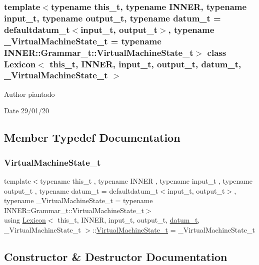 \subsubsection*{template$<$typename this\+\_\+t, typename I\+N\+N\+ER, typename input\+\_\+t, typename output\+\_\+t, typename datum\+\_\+t = defaultdatum\+\_\+t$<$input\+\_\+t, output\+\_\+t$>$, typename \+\_\+\+Virtual\+Machine\+State\+\_\+t = typename I\+N\+N\+E\+R\+::\+Grammar\+\_\+t\+::\+Virtual\+Machine\+State\+\_\+t$>$\newline
class Lexicon$<$ this\+\_\+t, I\+N\+N\+E\+R, input\+\_\+t, output\+\_\+t, datum\+\_\+t, \+\_\+\+Virtual\+Machine\+State\+\_\+t $>$}

\begin{DoxyAuthor}{Author}
piantado 
\end{DoxyAuthor}
\begin{DoxyDate}{Date}
29/01/20 
\end{DoxyDate}


\subsection{Member Typedef Documentation}
\mbox{\label{class_lexicon_aad6ccf985be61e5386ea67f0f7670d65}} 
\subsubsection{\texorpdfstring{Virtual\+Machine\+State\+\_\+t}{VirtualMachineState\_t}}
{\footnotesize\ttfamily template$<$typename this\+\_\+t , typename I\+N\+N\+ER , typename input\+\_\+t , typename output\+\_\+t , typename datum\+\_\+t  = defaultdatum\+\_\+t$<$input\+\_\+t, output\+\_\+t$>$, typename \+\_\+\+Virtual\+Machine\+State\+\_\+t  = typename I\+N\+N\+E\+R\+::\+Grammar\+\_\+t\+::\+Virtual\+Machine\+State\+\_\+t$>$ \\
using \hyperlink{class_lexicon}{Lexicon}$<$ this\+\_\+t, I\+N\+N\+ER, input\+\_\+t, output\+\_\+t, \hyperlink{class_bayesable_a9f1a6c0cd7855550fa10b1a8f13a5867}{datum\+\_\+t}, \+\_\+\+Virtual\+Machine\+State\+\_\+t $>$\+::\hyperlink{class_lexicon_aad6ccf985be61e5386ea67f0f7670d65}{Virtual\+Machine\+State\+\_\+t} =  \+\_\+\+Virtual\+Machine\+State\+\_\+t}



\subsection{Constructor \& Destructor Documentation}
\mbox{\label{class_lexicon_a953fa0e2f69d1b72fa567a09f80ef73c}} 
